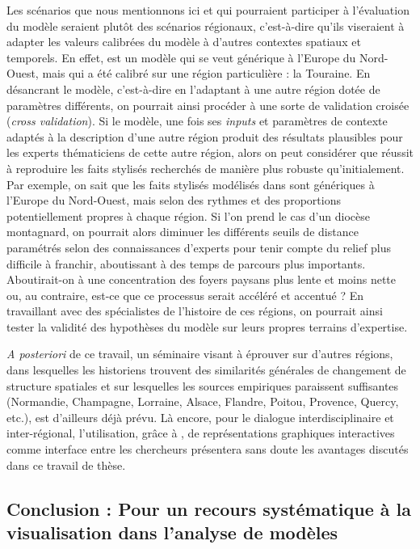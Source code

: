 Les scénarios que nous mentionnons ici et qui pourraient participer à l'évaluation du modèle seraient plutôt des scénarios régionaux, c'est-à-dire qu'ils viseraient à adapter les valeurs calibrées du modèle à d'autres contextes spatiaux et temporels.
En effet, \simfeodal{} est un modèle qui se veut générique à l'Europe du Nord-Ouest, mais qui a été calibré sur une région particulière : la Touraine.
En désancrant le modèle, c'est-à-dire en l'adaptant à une autre région dotée de paramètres différents, on pourrait ainsi procéder à une sorte de validation croisée (\textit{cross validation}).
Si le modèle, une fois ses \textit{inputs} et paramètres de contexte adaptés à la description d'une autre région produit des résultats plausibles pour les experts thématiciens de cette autre région, alors on peut considérer que \simfeodal{} réussit à reproduire les faits stylisés recherchés de manière plus robuste qu'initialement.
Par exemple, on sait que les faits stylisés modélisés dans \simfeodal{} sont génériques à l'Europe du Nord-Ouest, mais selon des rythmes et des proportions potentiellement propres à chaque région.
Si l'on prend le cas d'un diocèse montagnard, on pourrait alors diminuer les différents seuils de distance paramétrés selon des connaissances d'experts pour tenir compte du relief plus difficile à franchir, aboutissant à des temps de parcours plus importants.
Aboutirait-on à une concentration des foyers paysans plus lente et moins nette ou, au contraire, est-ce que ce processus serait accéléré et accentué ?
En travaillant avec des spécialistes de l'histoire de ces régions, on pourrait ainsi tester la validité des hypothèses du modèle sur leurs propres terrains d'expertise.


\textit{A posteriori} de ce travail, un séminaire visant à éprouver \simfeodal{} sur d'autres régions, dans lesquelles les historiens trouvent des similarités générales de changement de structure spatiales et sur lesquelles les sources empiriques paraissent suffisantes (Normandie, Champagne, Lorraine, Alsace, Flandre, Poitou, Provence, Quercy, etc.), est d'ailleurs déjà prévu.
Là encore, pour le dialogue interdisciplinaire et inter-régional, l'utilisation, grâce à \simedb{}, de représentations graphiques interactives comme interface entre les chercheurs présentera sans doute les avantages discutés dans ce travail de thèse.

\subsection{Conclusion : Pour un recours systématique à la visualisation dans l'analyse de modèles}


